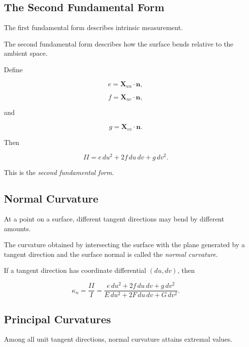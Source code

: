 \subsection{The Second Fundamental Form}
\label{subsec:second-fundamental-form}

The first fundamental form describes intrinsic measurement.

The second fundamental form describes how the surface bends relative to the
ambient space.

Define

\[
e
=
\mathbf{X}_{uu}\cdot\mathbf{n},
\]

\[
f
=
\mathbf{X}_{uv}\cdot\mathbf{n},
\]

and

\[
g
=
\mathbf{X}_{vv}\cdot\mathbf{n}.
\]

Then

\[
\boxed{
II
=
e\,du^2
+
2f\,du\,dv
+
g\,dv^2.
}
\]

This is the \emph{second fundamental form}.

\subsection{Normal Curvature}
\label{subsec:normal-curvature}

At a point on a surface, different tangent directions may bend by different
amounts.

The curvature obtained by intersecting the surface with the plane generated
by a tangent direction and the surface normal is called the
\emph{normal curvature}.

If a tangent direction has coordinate differential \((du,dv)\), then

\[
\boxed{
\kappa_n
=
\frac{II}{I}
=
\frac{
e\,du^2+2f\,du\,dv+g\,dv^2
}{
E\,du^2+2F\,du\,dv+G\,dv^2
}.
}
\]

\subsection{Principal Curvatures}
\label{subsec:principal-curvatures}

Among all unit tangent directions, normal curvature attains extremal values.

